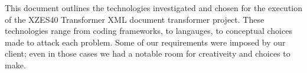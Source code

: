 This document outlines the technologies investigated and chosen for the execution of the XZES40 Transformer XML document transformer project.
These technologies range from coding frameworks, to langauges, to conceptual choices made to attack each problem.
Some of our requirements were imposed by our client; even in those cases we had a notable room for creativeity and choices to make.

